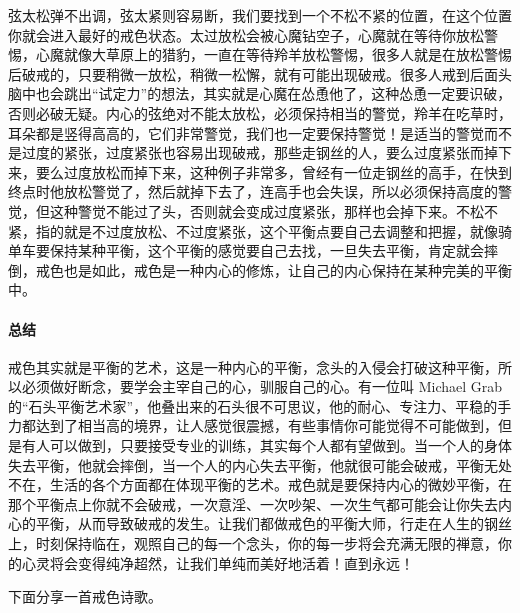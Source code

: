 弦太松弹不出调，弦太紧则容易断，我们要找到一个不松不紧的位置，在这个位置你就会进入最好的戒色状态。太过放松会被心魔钻空子，心魔就在等待你放松警惕，心魔就像大草原上的猎豹，一直在等待羚羊放松警惕，很多人就是在放松警惕后破戒的，只要稍微一放松，稍微一松懈，就有可能出现破戒。很多人戒到后面头脑中也会跳出“试定力”的想法，其实就是心魔在怂恿他了，这种怂恿一定要识破，否则必破无疑。内心的弦绝对不能太放松，必须保持相当的警觉，羚羊在吃草时，耳朵都是竖得高高的，它们非常警觉，我们也一定要保持警觉！是适当的警觉而不是过度的紧张，过度紧张也容易出现破戒，那些走钢丝的人，要么过度紧张而掉下来，要么过度放松而掉下来，这种例子非常多，曾经有一位走钢丝的高手，在快到终点时他放松警觉了，然后就掉下去了，连高手也会失误，所以必须保持高度的警觉，但这种警觉不能过了头，否则就会变成过度紧张，那样也会掉下来。不松不紧，指的就是不过度放松、不过度紧张，这个平衡点要自己去调整和把握，就像骑单车要保持某种平衡，这个平衡的感觉要自己去找，一旦失去平衡，肯定就会摔倒，戒色也是如此，戒色是一种内心的修炼，让自己的内心保持在某种完美的平衡中。

\paragraph*{总结}

戒色其实就是平衡的艺术，这是一种内心的平衡，念头的入侵会打破这种平衡，所以必须做好断念，要学会主宰自己的心，驯服自己的心。有一位叫 Michael Grab 的“石头平衡艺术家”，他叠出来的石头很不可思议，他的耐心、专注力、平稳的手力都达到了相当高的境界，让人感觉很震撼，有些事情你可能觉得不可能做到，但是有人可以做到，只要接受专业的训练，其实每个人都有望做到。当一个人的身体失去平衡，他就会摔倒，当一个人的内心失去平衡，他就很可能会破戒，平衡无处不在，生活的各个方面都在体现平衡的艺术。戒色就是要保持内心的微妙平衡，在那个平衡点上你就不会破戒，一次意淫、一次吵架、一次生气都可能会让你失去内心的平衡，从而导致破戒的发生。让我们都做戒色的平衡大师，行走在人生的钢丝上，时刻保持临在，观照自己的每一个念头，你的每一步将会充满无限的禅意，你的心灵将会变得纯净超然，让我们单纯而美好地活着！直到永远！

下面分享一首戒色诗歌。

